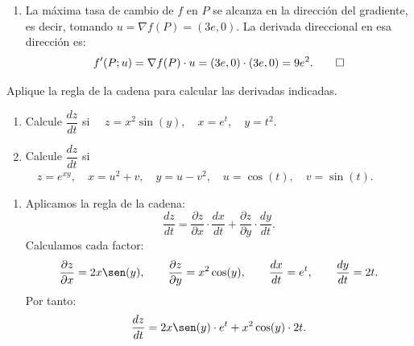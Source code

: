 \documentclass[11pt,respuestas,a4]{aleph-examen}
\begin{document}
\begin{preguntas}
\begin{respuesta}
\begin{enumerate}
    \item La máxima tasa de cambio de $f$ en $P$ se alcanza en la dirección del gradiente, es decir, tomando $u=\nabla f(P)=(3e,0)$. La derivada direccional en esa dirección es:
    \[
        f'(P;u)
        =
        \nabla f(P)\cdot u
        =
        (3e,0)\cdot(3e,0)
        =
        9e^2.\qedhere
    \]
\end{enumerate}
\end{respuesta}


\item
Aplique la regla de la cadena para calcular las derivadas indicadas.
\begin{enumerate}[leftmargin=*]
    \item Calcule $\dfrac{dz}{dt}$ si
    $\quad
        z=x^2\sin(y),
        \quad
        x=e^t,
        \quad
        y=t^2.
    $

    \item Calcule $\dfrac{dz}{dt}$ si
    $
        \quad
        z=e^{xy},
        \quad
        x=u^2+v,
        \quad
        y=u-v^2,
        \quad
        u=\cos(t),
        \quad
        v=\sin(t).
    $
\end{enumerate}

\begin{respuesta}
\begin{enumerate}
    \item Aplicamos la regla de la cadena:
    \[
        \frac{dz}{dt}
        =
        \frac{\partial z}{\partial x}\cdot\frac{dx}{dt}
        +
        \frac{\partial z}{\partial y}\cdot\frac{dy}{dt}.
    \]
    Calculamos cada factor:
    \[
        \frac{\partial z}{\partial x}=2x\sen(y),\qquad
        \frac{\partial z}{\partial y}=x^2\cos(y),\qquad
        \frac{dx}{dt}=e^t,\qquad
        \frac{dy}{dt}=2t.
    \]
    Por tanto:
    \[
        \frac{dz}{dt}
        =
        2x\sen(y)\cdot e^t+x^2\cos(y)\cdot 2t.
    \]


\end{enumerate}
\end{respuesta}
\end{preguntas}
\end{document}
